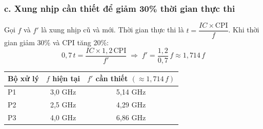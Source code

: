 \subsubsection*{c. Xung nhịp cần thiết để giảm 30\% thời gian thực thi}

Gọi $f$ và $f'$ là xung nhịp cũ và mới. Thời gian thực thi là $t = \dfrac{IC \times \text{CPI}}{f}$. Khi thời gian giảm 30\% và CPI tăng 20\%:
\[
  0{,}7\,t = \frac{IC \times 1{,}2\,\text{CPI}}{f'}
  \;\Longrightarrow\;
  f' = \frac{1{,}2}{0{,}7}\,f \approx 1{,}714\,f
\]

\begin{center}
\begin{tabular}{lcc}
  \toprule
  Bộ xử lý & $f$ hiện tại & $f'$ cần thiết $(\approx 1{,}714\,f)$  \\
  \midrule
  P1 & 3{,}0 GHz & 5{,}14 GHz \\
  P2 & 2{,}5 GHz & 4{,}29 GHz \\
  P3 & 4{,}0 GHz & 6{,}86 GHz \\
  \bottomrule
\end{tabular}
\end{center}
